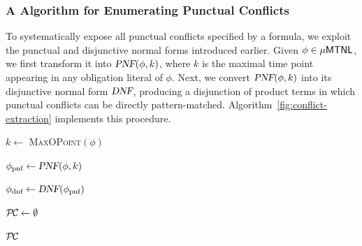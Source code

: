 \subsubsection{A  Algorithm for Enumerating Punctual Conflicts}\label{subsec:dpnf}

To systematically expose all punctual conflicts specified by a formula, we exploit the punctual and disjunctive normal forms introduced earlier.  
Given $\phi \in \mathsf{\mu MTNL}$, we first transform it into $\textsl{PNF}(\phi,k)$, where $k$ is the maximal time point appearing in any obligation literal of $\phi$.  
Next, we convert $\textsl{PNF}(\phi,k)$ into its disjunctive normal form $\textsl{DNF}$, producing a disjunction of product terms in which punctual conflicts can be directly pattern-matched.  
Algorithm~\ref{fig:conflict-extraction} implements this procedure.

\begin{minipage}{0.95\textwidth}
\begin{algorithm}[H]
\caption{Procedure \textsc{PunctualConflicts} }
\label{fig:conflict-extraction}

\BlankLine
$k \gets$ \textsc{MaxOPoint}$(\phi)$ 

$\phi_{\text{pnf}} \gets \textsl{PNF}(\phi, k)$ 

$\phi_{\text{dnf}} \gets \textsl{DNF}(\phi_{\text{pnf}})$ 

$\mathcall{PC} \gets \emptyset$ 

\Return $\mathcall{PC}$

\end{algorithm}
\end{minipage}

